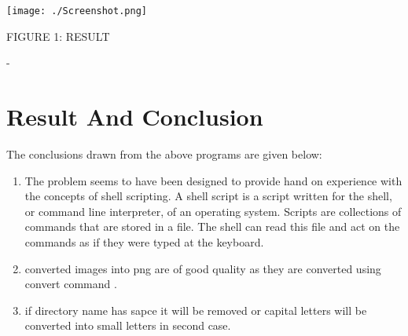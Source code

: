 \documentclass [12 pt ]{article}
\begin{document}
\begin{center}
\vspace{1cm}
\texttt{[image: ./Screenshot.png]}

FIGURE 1: RESULT 
\end{center}-



 \newpage
  \section{Result And Conclusion}
The conclusions drawn from the above programs are given below:

\begin{enumerate}
 \item The problem seems to have been designed to provide hand on experience with the concepts of shell scripting. 
A shell script is a script written for the shell, or command line interpreter, of an operating system.
Scripts are collections of commands that are stored in a file. The shell can read this file and act on the commands as if they were typed at the keyboard.
 \item converted images into png are of good quality as they are converted using convert command .
\item if directory name has sapce it will be removed or capital letters will be converted into small letters in second case.
 
\end{enumerate}

 
\end{document}
